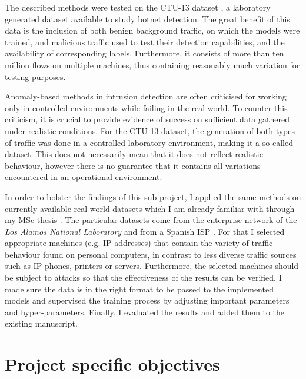\documentclass[a4paper,12pt,twoside]{report}
\begin{document}

The described methods were tested on the CTU-13 dataset \cite{garcia2014empirical}, a laboratory generated dataset available to study botnet detection. The great benefit of this data is the inclusion of both benign background traffic, on which the models were trained, and malicious traffic used to test their detection capabilities, and the availability of corresponding labels. Furthermore, it consists of more than ten million flows on multiple machines, thus containing reasonably much variation for testing purposes.

Anomaly-based methods in intrusion detection are often criticised for working only in controlled environments while failing in the real world. To counter this criticism, it is crucial to provide evidence of success on sufficient data gathered under realistic conditions. For the CTU-13 dataset, the generation of both types of traffic was done in a controlled laboratory environment, making it a so called  dataset. This does not necessarily mean that it does not reflect realistic behaviour, however there is no guarantee that it contains all variations encountered in an operational environment. 

In order to bolster the findings of this sub-project, I applied the same methods on currently available real-world datasets which I am already familiar with through my MSc thesis \cite{clausen2018bayesian}. The particular datasets come from the enterprise network of the \textit{Los Alamos National Laboratory} \cite{kent-2015-cyberdata1} and from a Spanish ISP \cite{macia2018ugr}. For that I selected appropriate machines (e.g. IP addresses) that contain the variety of traffic behaviour found on personal computers, in contrast to less diverse traffic sources such as IP-phones, printers or servers. Furthermore, the selected machines should be subject to attacks so that the effectiveness of the results can be verified. I made sure the data is in the right format to be passed to the implemented models and supervised the training process by adjusting important parameters and hyper-parameters. Finally, I evaluated the results and added them to the existing manuscript.

\chapter{Project specific objectives}\label{Obj}
\end{document}
